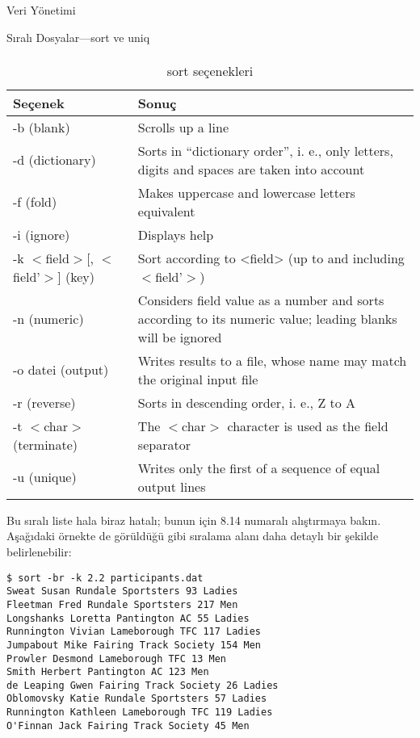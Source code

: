 \begin{section}{Veri Yönetimi}
\begin{subsection}{Sıralı Dosyalar—sort ve uniq}
\paragraph{}{
\begin {table}[H]
\caption {sort seçenekleri} \label{tab:tablo83} 
\begin{tabular}{l l}
\hline
Seçenek & Sonuç\\
\hline
-b (blank) & Scrolls up a line\\
-d (dictionary) & Sorts in “dictionary order”, i. e., only letters, digits and spaces are taken into account\\
-f (fold) & Makes uppercase and lowercase letters equivalent\\
-i (ignore) & Displays help \\
-k $<$field$>$[, $<$field’$>$] (key) & Sort according to <field> (up to and including $<$field’$>$) \\
-n (numeric) & Considers field value as a number and sorts according to its numeric value; leading blanks will be ignored\\
-o datei (output) & Writes results to a file, whose name may match the original input file\\
-r (reverse) & Sorts in descending order, i. e., Z to A\\
-t $<$char$>$ (terminate) & The $<$char$>$ character is used as the field separator\\
-u (unique) & Writes only the first of a sequence of equal output lines\\
\hline
\end{tabular}
\end {table}}

Bu sıralı liste hala biraz hatalı; bunun için 8.14 numaralı alıştırmaya bakın. 
Aşağıdaki örnekte de görüldüğü gibi sıralama alanı daha detaylı bir şekilde belirlenebilir:
\footnotesize
\begin{verbatim}
$ sort -br -k 2.2 participants.dat
Sweat Susan Rundale Sportsters 93 Ladies
Fleetman Fred Rundale Sportsters 217 Men
Longshanks Loretta Pantington AC 55 Ladies
Runnington Vivian Lameborough TFC 117 Ladies
Jumpabout Mike Fairing Track Society 154 Men
Prowler Desmond Lameborough TFC 13 Men
Smith Herbert Pantington AC 123 Men
de Leaping Gwen Fairing Track Society 26 Ladies
Oblomovsky Katie Rundale Sportsters 57 Ladies
Runnington Kathleen Lameborough TFC 119 Ladies
O'Finnan Jack Fairing Track Society 45 Men
\end{verbatim}
\normalsize


\end{subsection}
\end{section}
